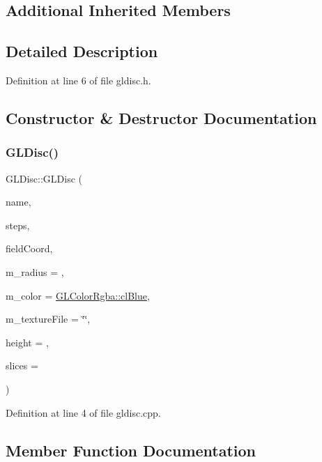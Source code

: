 \subsection*{Additional Inherited Members}


\subsection{Detailed Description}


Definition at line 6 of file gldisc.\+h.



\subsection{Constructor \& Destructor Documentation}
\mbox{\label{class_g_l_disc_a0964e31d88f1b4915b536b9943e0e2f8}} 
\subsubsection{\texorpdfstring{GLDisc()}{GLDisc()}}
{\footnotesize\ttfamily G\+L\+Disc\+::\+G\+L\+Disc (\begin{DoxyParamCaption}\item[{const Q\+String \&}]{name,  }\item[{int}]{steps,  }\item[{const Q\+Point \&}]{field\+Coord,  }\item[{float}]{m\+\_\+radius = {},  }\item[{const \mbox{\hyperlink{class_g_l_color_rgba}{G\+L\+Color\+Rgba}} \&}]{m\+\_\+color = {\ttfamily \mbox{\hyperlink{class_g_l_color_rgba_abf246bb4f542851d17ba84b5143a9214}{G\+L\+Color\+Rgba\+::cl\+Blue}}},  }\item[{const Q\+String}]{m\+\_\+texture\+File = {\ttfamily \char`\"{}\char`\"{}},  }\item[{float}]{height = {},  }\item[{\mbox{\hyperlink{gldefines_8h_af3c748960f29c42e5b7f1dc449ab66ff}{Index\+Type}}}]{slices = {} }\end{DoxyParamCaption})}



Definition at line 4 of file gldisc.\+cpp.



\subsection{Member Function Documentation}
\mbox{\label{class_g_l_disc_a7fca90525cba1fb6099d70730375cc6e}} 
